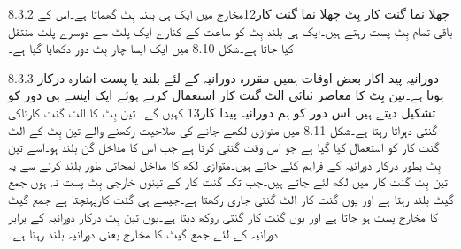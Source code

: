 8.3.2 چھلا نما گنت کار
	بِٹ چھلا نما گنت کار12مخارج میں ایک ہی بلند بِٹ گھماتا ہے۔اس کے باقی تمام بِٹ پست رہتے ہیں۔ایک ہی بلند بِٹ کو ساعت کے کنارے ایک پلٹ سے دوسرے پلٹ منتقل کیا جاتا ہے۔شکل 8.10 میں ایک ایسا چار بِٹ دور دکھایا گیا ہے۔


8.3.3 دورانیہ پید اکار
	بعض اوقات ہمیں مقررہ دورانیہ کے لئے بلند یا پست اشارہ درکار ہوتا ہے۔تین بِٹ کا معاصر ثنائی الٹ گنت کار استعمال کرتے ہوئے ایک ایسے ہی دور کو تشکیل دیتے ہیں۔اس دور کو ہم دورانیہ پیدا کار13 کہیں گے۔ 
	تین بِٹ کا الٹ گنت کارتاکی گنتی دہراتا رہتا ہے۔شکل 8.11 میں متوازی لکھے جانے کی صلاحیت رکھنے والے تین بِٹ کے الٹ گنت کار کو استعمال کیا گیا ہے جو اس وقت گنتی کرتا ہے جب اس کا مداخل گن بلند ہو۔اسے تین بِٹ بطور درکار دورانیہ کے فراہم کئے جاتے ہیں۔متوازی لکھ کا مداخل لمحاتی طور بلند کرنے سے یہ تین بِٹ گنت کار میں لکھ لئے جاتے ہیں۔جب تک گنت کار کے تینوں خارجی بِٹ پست نہ ہوں جمع گیٹ بلند رہتا ہے اور یوں گنت کار الٹ گنتی جاری رکھتا ہے۔جیسے ہی گنت کارپہنچتا ہے جمع گیٹ کا مخارج پست ہو جاتا ہے اور یوں گنت کار گنتی روکھ دیتا ہے۔یوں تین بِٹ درکار دورانیہ کے برابر دورانیہ کے لئے جمع گیٹ کا مخارج یعنی دورانیہ بلند رہتا ہے۔

